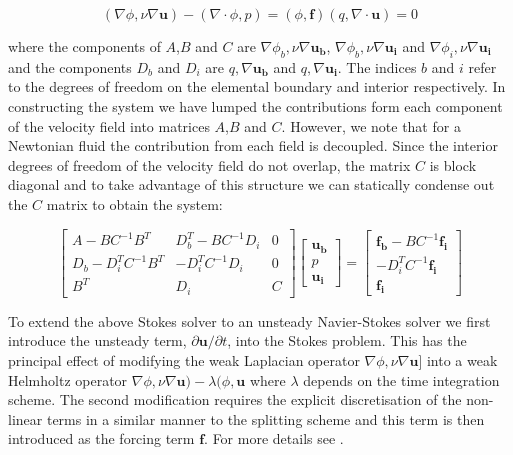 \begin{subequations}
\begin{equation}
 (\nabla \phi,\nu \nabla \boldsymbol{u}) - (\nabla\cdot\phi,p)=(\phi,\boldsymbol{f})
\end{equation}
\begin{equation}
 (q,\nabla \cdot \boldsymbol{u}) = 0
\end{equation}
\end{subequations}

where the components of $A$,$B$ and $C$ are
$\nabla\phi_b,\nu\nabla\boldsymbol{u_b}$,
$\nabla\phi_b,\nu\nabla\boldsymbol{u_i}$ and
$\nabla\phi_i,\nu\nabla\boldsymbol{u_i}$ and the components $D_b$ and
$D_i$ are $q,\nabla\boldsymbol{u_b}$ and $q,\nabla\boldsymbol{u_i}$.
The indices $b$ and $i$ refer to the degrees of freedom on the
elemental boundary and interior respectively. In constructing the
system we have lumped the contributions form each component of the
velocity field into matrices $A$,$B$ and $C$. However, we note that
for a Newtonian fluid the contribution from each field is
decoupled. Since the interior degrees of freedom of the velocity field
do not overlap, the matrix $C$ is block diagonal and to take advantage
of this structure we can statically condense out the $C$ matrix to
obtain the system:

\begin{equation}
\left[ \begin{array}{ccc}
 A-BC^{-1}B^T & D_b^T-BC^{-1}D_i & 0\\
 D_b-D_i^TC^{-1}B^T & -D_i^TC^{-1}D_i & 0\\
 B^T & D_i & C
 \end{array}\right]
 \left[ \begin{array}{c}
 \boldsymbol{u_b}\\
 p\\
 \boldsymbol{u_i}
 \end{array}\right] =
 \left[ \begin{array}{c}
 \boldsymbol{f_b} - BC^{-1}\boldsymbol{f_i}\\
 -D_i^TC^{-1}\boldsymbol{f_i}\\
 \boldsymbol{f_i}
 \end{array}\right]
 \end{equation}

 To extend the above Stokes solver to an unsteady Navier-Stokes solver
 we first introduce the unsteady term, $\partial
 \boldsymbol{u}/\partial t$, into the Stokes problem.  This has the
 principal effect of modifying the weak Laplacian operator
 $\nabla\phi,\nu\nabla\boldsymbol{u}$] into a weak Helmholtz operator
   $\nabla\phi,\nu\nabla\boldsymbol{u})-\lambda(\phi,\boldsymbol{u}$
   where $\lambda$ depends on the time integration scheme. The second
   modification requires the explicit discretisation of the non-linear
   terms in a similar manner to the splitting scheme and this term is
   then introduced as the forcing term $\boldsymbol{f}$. For more details see \cite{AiSh,ShAi}.



